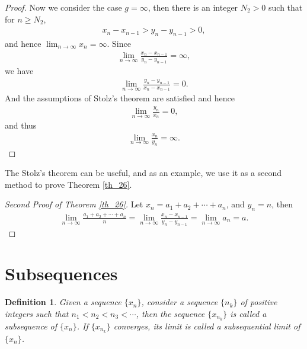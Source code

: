 \documentclass[10pt]{book}
\newtheorem{definition}{Definition}[chapter]
\theoremstyle{definition}
\numberwithin{equation}{chapter}
\begin{document}
\begin{proof}
Now we consider the case $g = \infty$, then there is an integer $N_2 > 0$ such that for $n \geq N_2$,
\begin{align*}
    x_n - x_{n-1} > y_n - y_{n-1} > 0,
\end{align*}
and hence $\lim_{n\to\infty} x_n = \infty$. Since
\begin{align*}
    \lim_{n\to\infty} \frac{x_n - x_{n-1}}{y_n - y_{n-1}} = \infty,
\end{align*}
we have
\begin{align*}
    \lim_{n\to\infty} \frac{y_n - y_{n-1}}{x_n - x_{n-1}} = 0.
\end{align*}
And the assumptions of Stolz's theorem are satisfied and hence
\begin{align*}
    \lim_{n\to\infty} \frac{y_n}{x_n} = 0,
\end{align*}
and thus 
\begin{align*}
    \lim_{n\to\infty} \frac{x_n}{y_n} = \infty.
\end{align*}
\end{proof}

\medskip

The Stolz's theorem can be useful, and as an example, we use it as a second method to prove Theorem \ref{th_26}.

\medskip

\begin{proof}[Second Proof of Theorem \ref{th_26}]
Let $x_n = a_1 + a_2 + \cdots + a_n$, and $y_n = n$, then
\begin{align*}
    \lim_{n\to\infty} \frac{a_1 + a_2 + \cdots + a_n}{n} = \lim_{n\to\infty} \frac{x_n - x_{n-1}}{y_n - y_{n-1}} = \lim_{n\to\infty} a_n = a.
\end{align*}
\end{proof}

\medskip


\section{Subsequences}

\begin{definition}
Given a sequence $\{x_n\}$, consider a sequence $\{n_k\}$ of positive integers such that $n_1 < n_2 < n_3 < \cdots$, then the sequence $\{x_{n_k}\}$ is called a subsequence of $\{x_n\}$. If $\{x_{n_k}\}$ converges, its limit is called a subsequential limit of $\{x_n\}$.
\end{definition}


\medskip
\end{document}
